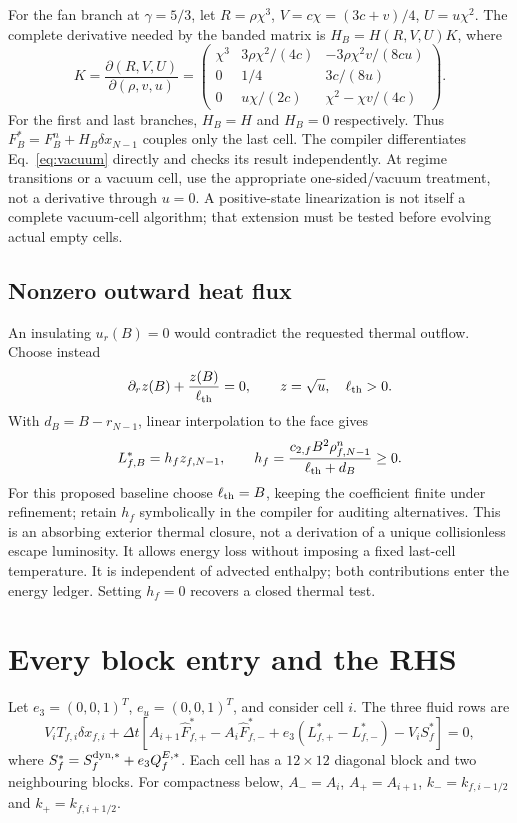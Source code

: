 \documentclass[11pt]{article}
\begin{document}
For the fan branch at $\gamma=5/3$, let
$R=\rho\chi^3$, $V=c\chi=(3c+v)/4$, $U=u\chi^2$.
The complete derivative needed by the banded matrix is $H_B=H(R,V,U)K$,
where
\begin{equation}
 K=\frac{\partial(R,V,U)}{\partial(\rho,v,u)}=
 \begin{pmatrix}
 \chi^3&3\rho\chi^2/(4c)&-3\rho\chi^2v/(8cu)\\
 0&1/4&3c/(8u)\\
 0&u\chi/(2c)&\chi^2-\chi v/(4c)
 \end{pmatrix}.
 \label{eq:vacjac}
\end{equation}
For the first and last branches, $H_B=H$ and $H_B=0$ respectively.
Thus $F_B^*=F_B^n+H_B\delta x_{N-1}$ couples only the last cell.
The compiler differentiates Eq.~\eqref{eq:vacuum} directly and checks
its result independently. At regime transitions or a vacuum cell,
use the appropriate one-sided/vacuum treatment, not a derivative through
$u=0$. A positive-state linearization is not itself a complete vacuum-cell
algorithm; that extension must be tested before evolving actual empty cells.

\subsection{Nonzero outward heat flux}
An insulating $u_r(B)=0$ would contradict the requested thermal outflow.
Choose instead
\begin{equation}
 \partial_r z(B)+\frac{z(B)}{\ell_{\rm th}}=0,\qquad
 z=\sqrt u,\quad\ell_{\rm th}>0.
\end{equation}
With $d_B=B-r_{N-1}$, linear interpolation to the face gives
\begin{equation}
 L_{f,B}^*=h_f z_{f,N-1},\qquad
 h_f=\frac{c_{2,f}B^2\rho_{f,N-1}^n}{\ell_{\rm th}+d_B}\ge0.
 \label{eq:thermalboundary}
\end{equation}
For this proposed baseline choose $\ell_{\rm th}=B$, keeping the
coefficient finite under refinement; retain $h_f$ symbolically in the
compiler for auditing alternatives. This is an absorbing exterior thermal
closure, not a derivation of a unique collisionless escape luminosity.
It allows energy loss without imposing a fixed last-cell temperature.
It is independent of advected enthalpy; both contributions enter the
energy ledger. Setting $h_f=0$ recovers a closed thermal test.

\section{Every block entry and the RHS}\label{sec:matrix}
Let $e_3=(0,0,1)^T$, $e_u=(0,0,1)^T$, and consider cell $i$.
The three fluid rows are
\begin{equation}
 V_iT_{f,i}\delta x_{f,i}+\Delta t\left[
 A_{i+1}\widehat F_{f,+}^*-A_i\widehat F_{f,-}^*
 +e_3(L_{f,+}^*-L_{f,-}^*)-V_iS_f^*\right]=0,
 \label{eq:assembledrow}
\end{equation}
where $S_f^*=S_f^{\rm dyn,*}+e_3Q_f^{E,*}$.
Each cell has a $12\times12$ diagonal block and two neighbouring blocks.
For compactness below, $A_-=A_i$, $A_+=A_{i+1}$,
$k_-=k_{f,i-1/2}$ and $k_+=k_{f,i+1/2}$.
\end{document}
